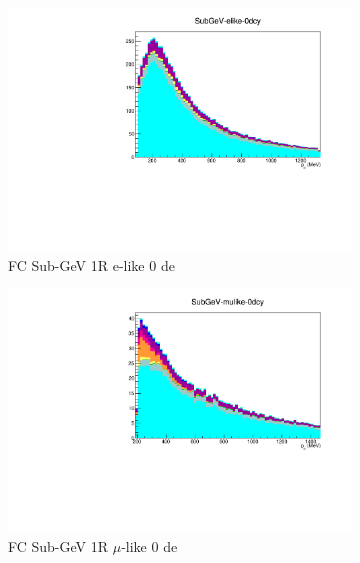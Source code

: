 \begin{figure}[ht]
    \begin{subfigure}[t]{0.49\textwidth}
    \includegraphics[width=\textwidth, trim= 0 0 0 30, clip]{Figures/Selections/AtmosphericByMode/SubGeV-elike-0dcy_LepMom.pdf}
    \caption{FC Sub-GeV 1R e-like 0 de}
    \end{subfigure}
    \begin{subfigure}[t]{0.49\textwidth}
    \includegraphics[width=\textwidth, trim= 0 0 0 30, clip]{Figures/Selections/AtmosphericByMode/SubGeV-mulike-0dcy_LepMom.pdf}
    \caption{FC Sub-GeV 1R $\mu$-like 0 de}
    \end{subfigure}
    \begin{subfigure}[t]{0.49\textwidth}

\end{subfigure}
\end{figure}
